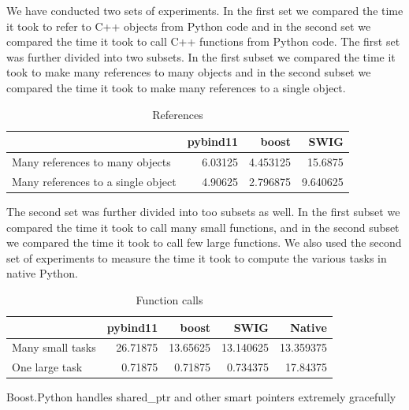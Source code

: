 We have conducted two sets of experiments. In the first set we
compared the time it took to refer to C++ objects from Python code and
in the second set we compared the time it took to call C++ functions
from Python code. The first set was further divided into two subsets.
In the first subset we compared the time it took to make many
references to many objects and in the second subset we compared the
time it took to make many references to a single object.

\begin{table}
  \caption{References}
  \centering\begin{tabular}{|l|r|r|r|}
    \hline
    & \textbf{pybind11} & \textbf{boost} & \textbf{SWIG}\\
    \hline
    \hline
    Many references to many objects    & 6.03125  & 4.453125 & 15.6875\\
    Many references to a single object & 4.90625  & 2.796875 &  9.640625\\
    \hline
  \end{tabular}
\end{table}

The second set was further divided into too subsets as well. In the
first subset we compared the time it took to call many small
functions, and in the second subset we compared the time it took to
call few large functions. We also used the second set of experiments to
measure the time it took to compute the various tasks in native Python.

\begin{table}
  \caption{Function calls}
  \centering\begin{tabular}{|l|r|r|r|r|}
    \hline
    & \textbf{pybind11} & \textbf{boost} & \textbf{SWIG} & \textbf{Native}\\
    \hline
    \hline
    Many small tasks & 26.71875 & 13.65625 & 13.140625 & 13.359375\\
    One large task   & 0.71875  & 0.71875  & 0.734375  & 17.84375\\
    \hline
  \end{tabular}
\end{table}

Boost.Python handles shared\_ptr and other smart pointers extremely gracefully
